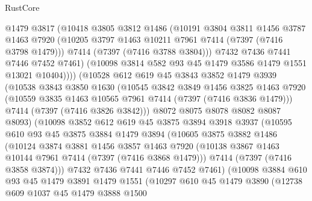 \begin{lexlean}{RustCore}
\begin{coremodule}
              @1479
              @3817
              (@10418
                @3805
                @3812
                @1486
                (@10191
                  @3804
                  @3811
                  @1456
                  @3787
                  @1463
                  @7920
                  (@10205 @3797 @1463 @10211 @7961 @7414 (@7397 (@7416 @3798 @1479)))
                  @7414
                  (@7397 (@7416 @3788 @3804)))
                @7432
                @7436
                @7441
                @7446
                @7452
                @7461)
              (@10098 @3814 @582 @93 @45 @1479 @3586 @1479 @1551 @13021 @10404))))
        (@10528
          @612
          @619
          @45
          @3843
          @3852
          @1479
          @3939
          (@10538
            @3843
            @3850
            @1630
            (@10545
              @3842
              @3849
              @1456
              @3825
              @1463
              @7920
              (@10559 @3835 @1463 @10565 @7961 @7414 (@7397 (@7416 @3836 @1479)))
              @7414
              (@7397 (@7416 @3826 @3842)))
            @8072
            @8075
            @8078
            @8082
            @8087
            @8093)
          (@10098
            @3852
            @612
            @619
            @45
            @3875
            @3894
            @3918
            @3937
            (@10595
              @610
              @93
              @45
              @3875
              @3884
              @1479
              @3894
              (@10605
                @3875
                @3882
                @1486
                (@10124
                  @3874
                  @3881
                  @1456
                  @3857
                  @1463
                  @7920
                  (@10138 @3867 @1463 @10144 @7961 @7414 (@7397 (@7416 @3868 @1479)))
                  @7414
                  (@7397 (@7416 @3858 @3874)))
                @7432
                @7436
                @7441
                @7446
                @7452
                @7461)
              (@10098
                @3884
                @610
                @93
                @45
                @1479
                @3891
                @1479
                @1551
                (@10297
                  @610
                  @45
                  @1479
                  @3890
                  (@12738
                    @609
                    @1037
                    @45
                    @1479
                    @3888
                    @1500

\end{coremodule}
\end{lexlean}
